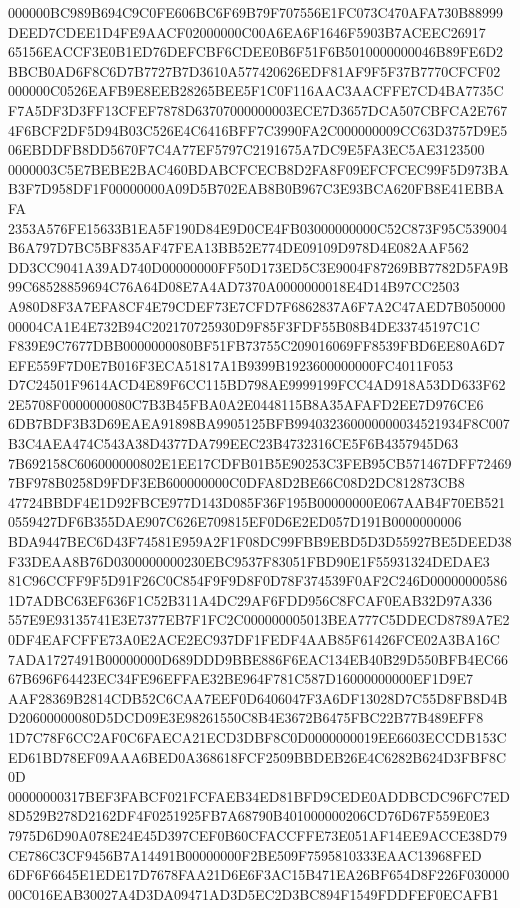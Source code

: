 \documentclass[UTF8,fontset=fandol,zihao=-4,a4paper]{ctexart}
\begin{document}
{{000000BC989B694C9C0FE606BC6F69B79F707556E1FC073C470AFA730B88999DEED7CDEE1D4FE9AACF02000000C00A6EA6F1646F5903B7ACEEC26917
65156EACCF3E0B1ED76DEFCBF6CDEE0B6F51F6B5010000000046B89FE6D2BBCB0AD6F8C6D7B7727B7D3610A577420626EDF81AF9F5F37B7770CFCF02
000000C0526EAFB9E8EEB28265BEE5F1C0F116AAC3AACFFE7CD4BA7735CF7A5DF3D3FF13CFEF7878D63707000000003ECE7D3657DCA507CBFCA2E767
4F6BCF2DF5D94B03C526E4C6416BFF7C3990FA2C000000009CC63D3757D9E506EBDDFB8DD5670F7C4A77EF5797C2191675A7DC9E5FA3EC5AE3123500
0000003C5E7BEBE2BAC460BDABCFCECB8D2FA8F09EFCFCEC99F5D973BAB3F7D958DF1F00000000A09D5B702EAB8B0B967C3E93BCA620FB8E41EBBAFA
2353A576FE15633B1EA5F190D84E9D0CE4FB03000000000C52C873F95C539004B6A797D7BC5BF835AF47FEA13BB52E774DE09109D978D4E082AAF562
DD3CC9041A39AD740D00000000FF50D173ED5C3E9004F87269BB7782D5FA9B99C68528859694C76A64D08E7A4AD7370A0000000018E4D14B97CC2503
A980D8F3A7EFA8CF4E79CDEF73E7CFD7F6862837A6F7A2C47AED7B05000000004CA1E4E732B94C202170725930D9F85F3FDF55B08B4DE33745197C1C
F839E9C7677DBB0000000080BF51FB73755C209016069FF8539FBD6EE80A6D7EFE559F7D0E7B016F3ECA51817A1B9399B1923600000000FC4011F053
D7C24501F9614ACD4E89F6CC115BD798AE9999199FCC4AD918A53DD633F622E5708F0000000080C7B3B45FBA0A2E0448115B8A35AFAFD2EE7D976CE6
6DB7BDF3B3D69EAEA91898BA9905125BFB994032360000000034521934F8C007B3C4AEA474C543A38D4377DA799EEC23B4732316CE5F6B4357945D63
7B692158C606000000802E1EE17CDFB01B5E90253C3FEB95CB571467DFF724697BF978B0258D9FDF3EB600000000C0DFA8D2BE66C08D2DC812873CB8
47724BBDF4E1D92FBCE977D143D085F36F195B00000000E067AAB4F70EB5210559427DF6B355DAE907C626E709815EF0D6E2ED057D191B0000000006
BDA9447BEC6D43F74581E959A2F1F08DC99FBB9EBD5D3D55927BE5DEED38F33DEAA8B76D0300000000230EBC9537F83051FBD90E1F55931324DEDAE3
81C96CCFF9F5D91F26C0C854F9F9D8F0D78F374539F0AF2C246D000000005861D7ADBC63EF636F1C52B311A4DC29AF6FDD956C8FCAF0EAB32D97A336
557E9E93135741E3E7377EB7F1FC2C000000005013BEA777C5DDECD8789A7E20DF4EAFCFFE73A0E2ACE2EC937DF1FEDF4AAB85F61426FCE02A3BA16C
7ADA1727491B00000000D689DDD9BBE886F6EAC134EB40B29D550BFB4EC6667B696F64423EC34FE96EFFAE32BE964F781C587D16000000000EF1D9E7
AAF28369B2814CDB52C6CAA7EEF0D6406047F3A6DF13028D7C55D8FB8D4BD20600000080D5DCD09E3E98261550C8B4E3672B6475FBC22B77B489EFF8
1D7C78F6CC2AF0C6FAECA21ECD3DBF8C0D0000000019EE6603ECCDB153CED61BD78EF09AAA6BED0A368618FCF2509BBDEB26E4C6282B624D3FBF8C0D
00000000317BEF3FABCF021FCFAEB34ED81BFD9CEDE0ADDBCDC96FC7ED8D529B278D2162DF4F0251925FB7A68790B401000000206CD76D67F559E0E3
7975D6D90A078E24E45D397CEF0B60CFACCFFE73E051AF14EE9ACCE38D79CE786C3CF9456B7A14491B00000000F2BE509F7595810333EAAC13968FED
6DF6F6645E1EDE17D7678FAA21D6E6F3AC15B471EA26BF654D8F226F03000000C016EAB30027A4D3DA09471AD3D5EC2D3BC894F1549FDDFEF0ECAFB1
}}
\end{document}
